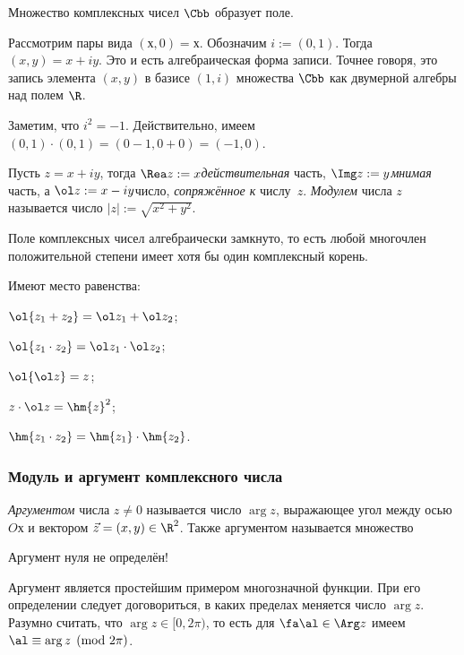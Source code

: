 \documentclass[a4paper]{article}
\begin{document}
\begin{stm}
Множество комплексных чисел $\Cbb$ образует поле.
\end{stm}

Рассмотрим пары вида $(х, 0) = х$. Обозначим $i := (0,1)$. Тогда $(x,y) = x+iy$. Это и есть алгебраическая
форма записи. Точнее говоря, это запись элемента $(x,y)$ в базисе $(1,i)$ множества $\Cbb$ как двумерной
алгебры над полем $\R$.

Заметим, что $i^2= -1$. Действительно, имеем $(0,1)\cdot(0,1) = (0 - 1, 0 + 0) = (-1,0)$.

Пусть $z = x + iy$, тогда $\Rea z := x$\т \emph{действительная} часть, $\Img z := y$\т \emph{мнимая} часть,
а $\ol z := x - iy$\т число, \emph{сопряжённое к} числу~$z$. \emph{Модулем} числа $z$ называется число $|z| := \sqrt{x^2+y^2}$.

\begin{theorem}[Гаусса]
Поле комплексных чисел алгебраически замкнуто, то есть любой многочлен положительной степени
имеет хотя бы один комплексный корень.
\end{theorem}

Имеют место равенства:

\begin{points}{-2}
\item $\ol{z_1 + z_2} = \ol z_1 + \ol z_2$;
\item $\ol{z_1\cdot z_2} = \ol z_1 \cdot \ol z_2$;
\item $\ol{\ol z} = z$;
\item $z\cdot\ol z = \hm{z}^2$;
\item $\hm{z_1 \cdot z_2 } = \hm{z_1}\cdot \hm{z_2}$.
\end{points}

\subsubsection{Модуль и аргумент комплексного числа}

\begin{df}
\emph{Аргументом} числа $z\neq 0$ называется число $\arg z$, выражающее угол между осью $Oх$ и вектором $\vec z =(x,y) \in \R^2$.
Также аргументом называется множество
\end{df}

\begin{note}
Аргумент нуля не определён!
\end{note}

Аргумент является простейшим примером многозначной функции. При его определении следует договориться, в каких
пределах меняется число $\arg z$. Разумно считать, что $\arg z \in [0,2\pi)$, то есть для
$\fa \al \in \Arg z$ имеем $\al \equiv \arg z \pmod{2\pi}$.
\end{document}
